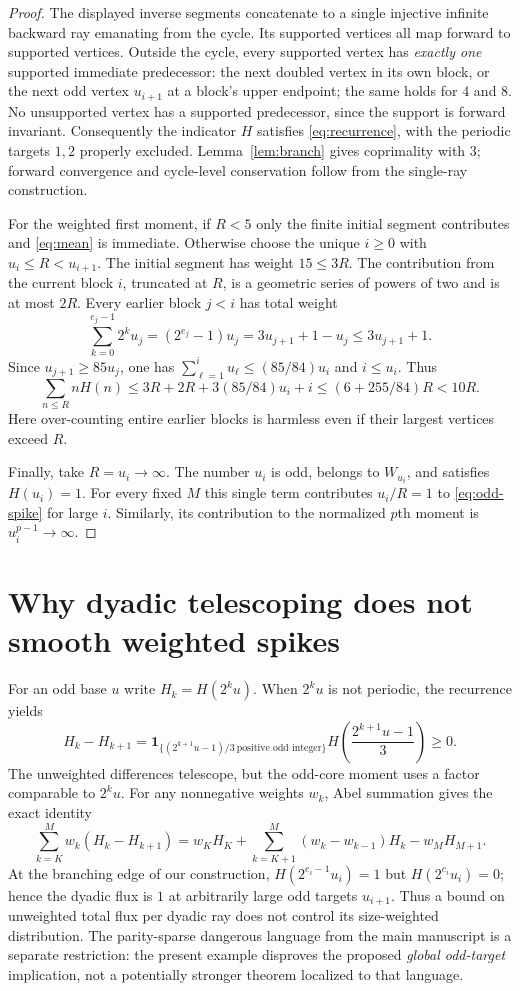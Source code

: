 \documentclass[11pt,a4paper]{article}
\newcommand{\one}{\mathbf 1}
\begin{document}
\begin{proof}
The displayed inverse segments concatenate to a single injective
infinite backward ray emanating from the cycle.  Its supported
vertices all map forward to supported vertices.  Outside the cycle,
every supported vertex has \emph{exactly one} supported immediate
predecessor: the next doubled vertex in its own block, or the next
odd vertex $u_{i+1}$ at a block's upper endpoint; the same holds for
$4$ and $8$.  No unsupported vertex has a supported predecessor,
since the support is forward invariant.  Consequently the indicator
$H$ satisfies \eqref{eq:recurrence}, with the periodic targets $1,2$
properly excluded.  Lemma~\ref{lem:branch} gives coprimality with $3$;
forward convergence and cycle-level conservation follow from the
single-ray construction.

For the weighted first moment, if $R<5$ only the finite initial segment
contributes and \eqref{eq:mean} is immediate.  Otherwise choose the
unique $i\ge0$ with $u_i\le R<u_{i+1}$.  The initial segment has
weight $15\le3R$.  The contribution from the current block $i$,
truncated at $R$, is a geometric series of powers of two and is at
most $2R$.  Every earlier block $j<i$ has total weight
\[
 \sum_{k=0}^{e_j-1}2^ku_j
 =(2^{e_j}-1)u_j=3u_{j+1}+1-u_j\le3u_{j+1}+1.
\]
Since $u_{j+1}\ge85u_j$, one has
$\sum_{\ell=1}^iu_\ell\le(85/84)u_i$ and $i\le u_i$.  Thus
\[
 \sum_{n\le R}nH(n)
 \le 3R+2R+3(85/84)u_i+i
 \le(6+255/84)R<10R.
\]
Here over-counting entire earlier blocks is harmless even if their
largest vertices exceed $R$.

Finally, take $R=u_i\to\infty$.  The number $u_i$ is odd, belongs
to $W_{u_i}$, and satisfies $H(u_i)=1$.  For every fixed $M$ this
single term contributes $u_i/R=1$ to \eqref{eq:odd-spike} for large
$i$.  Similarly, its contribution to the normalized $p$th moment
is $u_i^{p-1}\to\infty$.
\end{proof}

\section{Why dyadic telescoping does not smooth weighted spikes}
For an odd base $u$ write $H_k=H(2^ku)$.  When $2^ku$ is not
periodic, the recurrence yields
\[
 H_k-H_{k+1}=
 \one_{\{(2^{k+1}u-1)/3\ \text{positive odd integer}\}}
 H\left(\frac{2^{k+1}u-1}{3}\right)\ge0.
\]
The unweighted differences telescope, but the odd-core moment uses a
factor comparable to $2^ku$.  For any nonnegative weights $w_k$,
Abel summation gives the exact identity
\begin{equation}\label{eq:abel}
 \sum_{k=K}^M w_k(H_k-H_{k+1})
 =w_K H_K+\sum_{k=K+1}^M(w_k-w_{k-1})H_k-w_MH_{M+1}.
\end{equation}
At the branching edge of our construction,
$H(2^{e_i-1}u_i)=1$ but $H(2^{e_i}u_i)=0$; hence the dyadic
flux is $1$ at arbitrarily large odd targets $u_{i+1}$.
Thus a bound on unweighted total flux per dyadic ray does not
control its size-weighted distribution.  The parity-sparse dangerous
language from the main manuscript is a separate restriction: the
present example disproves the proposed \emph{global odd-target}
implication, not a potentially stronger theorem localized to that
language.
\end{document}
